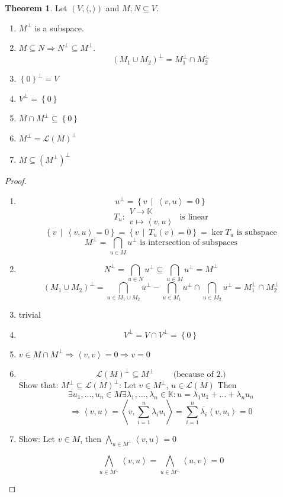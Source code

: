 \documentclass[a4paper,landscape,twocolumn]{article}
\newcommand\set[1]{\left\{#1\right\}}
\newcommand\setdef[2]{\left\{#1\,\middle|\,#2\right\}}
\newcommand\functional[1]{\left\langle{#1}\right\rangle}
\theoremstyle{definition}
\newtheorem{theorem}{Theorem}
\DeclareMathOperator\kernel{ker} %
\begin{document}
\begin{theorem}
  \label{satz-8.41}
  Let $(V, \langle, \rangle)$ and $M,N \subseteq V$.
  \begin{enumerate}
    \item $M^\bot$ is a subspace.
    \item $M \subseteq N \Rightarrow N^\bot \subseteq M^\bot$.
      \[ (M_1 \cup M_2)^\bot = M_1^\bot \cap M_2^\bot \]
    \item $\set{0}^\bot = V$
    \item $V^\bot = \set{0}$
    \item $M \cap M^\bot \subseteq \set{0}$
    \item $M^\bot = \mathcal L(M)^\bot$
    \item $M \subseteq (M^\bot)^\bot$
  \end{enumerate}
\end{theorem}
\begin{proof}
  \begin{enumerate}
    \item
      \[ u^\bot = \setdef{v}{\functional{v,u} = 0} \]
      \[ T_u: \substack{V \to \mathbb K \\ v \mapsto \functional{v,u}} \text{ is linear} \]
      \[ \setdef{v}{\functional{v,u} = 0} = \setdef{v}{T_u(v) = 0} = \kernel{T_u} \text{ is subspace} \]
      \[ M^\bot = \bigcap_{u \in M} u^\bot \text{ is intersection of subspaces} \]
    \item
      \[ N^\bot = \bigcap_{u \in N} u^\bot \subseteq \bigcap_{u \in M} u^\bot = M^\bot \]
      \[
        (M_1 \cup M_2)^\bot
        = \bigcap_{u \in M_1 \cup M_2} u^\bot - \bigcap_{u \in M_1} u^\bot \cap \bigcap_{u \in M_2} u^\bot
        = M_1^\bot \cap M_2^\bot
      \]
    \item trivial
    \item
      \[ V^\bot = V \cap V^\bot = \set{0} \]
    \item $v \in M \cap M^\bot \Rightarrow \functional{v,v} = 0 \Rightarrow v = 0$
    \item
      \[ \mathcal L(M)^\bot \subseteq M^\bot \qquad \text{ (because of 2.)} \]
      Show that: $M^\bot \subseteq \mathcal L(M)^\bot$: Let $v \in M^\bot$, $u \in \mathcal L(M)$
      Then
      \[ \exists u_1, \ldots, u_n \in M \exists \lambda_1, \ldots, \lambda_n \in \mathbb K:
        u = \lambda_1 u_1 + \ldots + \lambda_n u_n \]
      \[
        \Rightarrow \functional{v,u} = \functional{v,\sum_{i=1}^n \lambda_i u_i}
        = \sum_{i=1}^n \overline{\lambda_i} \functional{v, u_i} = 0
      \]
    \item
      Show: Let $v \in M$, then $\bigwedge_{u \in M^\bot} \functional{v,u} = 0$

      \[ \bigwedge_{u \in M^\bot} \functional{v,u} = \bigwedge_{u \in M^\bot} \functional{u,v} = 0 \]
  \end{enumerate}
\end{proof}
\end{document}

